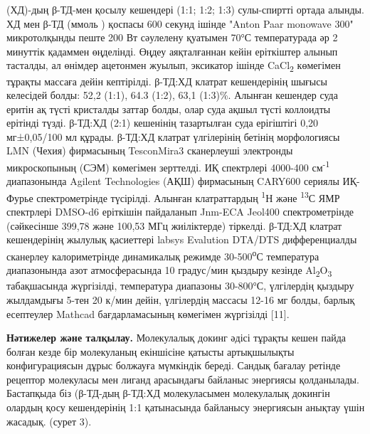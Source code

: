 (ХД)-дың β-ТД-мен қосылу кешендері (1:1; 1:2; 1:3) сулы-спиртті ортада
алынды. ХД мен β-ТД (ммоль ) қоспасы 600 секунд ішінде "Anton Paar
monowave 300" микротолқынды пеште 200 Вт сәулелену қуатымен 70°С
температурада әр 2 минуттік қадаммен өңделінді. Өңдеу аяқталғаннан кейін
еріткіштер алынып тасталды, ал өнімдер ацетонмен жуылып, эксикатор
ішінде CaCl\textsubscript{2} көмегімен тұрақты массаға дейін кептірілді.
β-ТД:ХД клатрат кешендерінің шығысы келесідей болды: 52,2 (1:1), 64.3
(1:2), 63,1 (1:3)\%. Алынған кешендер суда еритін ақ түсті кристалды
заттар болды, олар суда ақшыл түсті коллоидты ерітінді түзді. β-ТД:ХД
(2:1) кешенінің тазартылған суда ерігіштігі 0,20 мг±0,05/100 мл құрады.
β-ТД:ХД клатрат үлгілерінің бетінің морфологиясы LMN (Чехия) фирмасының
TesconMira3 сканерлеуші электронды микроскопының (СЭМ) көмегімен
зерттелді. ИҚ спектрлері 4000-400 см\textsuperscript{-1} диапазонында
Agilent Technologies (АҚШ) фирмасының CARY600 сериялы ИҚ-Фурье
спектрометрінде түсірілді. Алынған клатраттардың \textsuperscript{1}Н
және \textsuperscript{13}С ЯМР спектрлері DMSO-d6 еріткішін пайдаланып
Jnm-ECA Jeol400 спектрометрінде (сәйкесінше 399,78 және 100,53 МГц
жиіліктерде) тіркелді. β-ТД:ХД клатрат кешендерінің жылулық қасиеттері
labsys Evalution DTA/DTS дифференциалды сканерлеу калориметрінде
динамикалық режимде 30-500\textsuperscript{о}С температура диапазонында
азот атмосферасында 10 градус/мин қыздыру кезінде
Al\textsubscript{2}O\textsubscript{3} табақшасында жүргізілді,
температура диапазоны 30-800°С, үлгілердің қыздыру жылдамдығы 5-тен 20
к/мин дейін, үлгілердің массасы 12-16 мг болды, барлық есептеулер
Mathcad бағдарламасының көмегімен жүргізілді {[}11{]}.

{\bfseries Нәтижелер және талқылау.} Молекулалық докинг әдісі тұрақты кешен
пайда болған кезде бір молекуланың екіншісіне қатысты артықшылықты
конфигурациясын дұрыс болжауға мүмкіндік береді. Сандық бағалау ретінде
рецептор молекуласы мен лиганд арасындағы байланыс энергиясы
қолданылады. Бастапқыда біз (β-ТД-дың β-ТД:ХД молекуласымен молекулалық
докингін олардың қосу кешендерінің 1:1 қатынасында байланысу энергиясын
анықтау үшін жасадық. (сурет 3).


